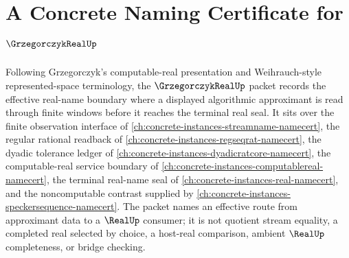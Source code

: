 \chapter{A Concrete Naming Certificate for $\GrzegorczykRealUp$}
\label{ch:concrete-instances-grzegorczyk-real-namecert}

Following Grzegorczyk's computable-real presentation and Weihrauch-style represented-space terminology, the $\GrzegorczykRealUp$ packet records the effective real-name boundary where a displayed algorithmic approximant is read through finite windows before it reaches the terminal real seal. It sits over the finite observation interface of \autoref{ch:concrete-instances-streamname-namecert}, the regular rational readback of \autoref{ch:concrete-instances-regseqrat-namecert}, the dyadic tolerance ledger of \autoref{ch:concrete-instances-dyadicratcore-namecert}, the computable-real service boundary of \autoref{ch:concrete-instances-computablereal-namecert}, the terminal real-name seal of \autoref{ch:concrete-instances-real-namecert}, and the noncomputable contrast supplied by \autoref{ch:concrete-instances-speckersequence-namecert}. The packet names an effective route from approximant data to a $\RealUp$ consumer; it is not quotient stream equality, a completed real selected by choice, a host-real comparison, ambient $\RealUp$ completeness, or bridge checking.

